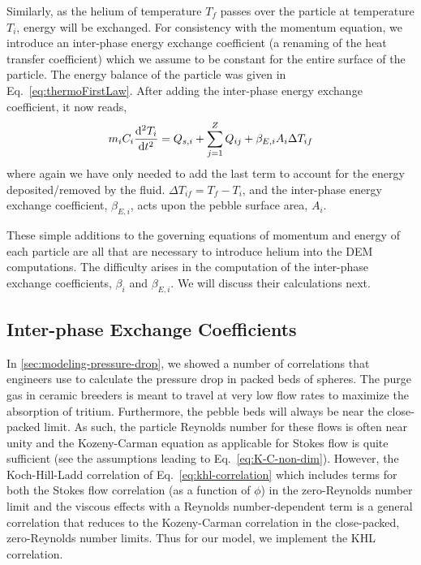 Similarly, as the helium of temperature $T_f$ passes over the particle at temperature $T_i$, energy will be exchanged. For consistency with the momentum equation, we introduce an inter-phase energy exchange coefficient (a renaming of the heat transfer coefficient) which we assume to be constant for the entire surface of the particle. The energy balance of the particle was given in Eq.~\ref{eq:thermoFirstLaw}. After adding the inter-phase energy exchange coefficient, it now reads,
\begin{equation}\label{eq:cfdem-dem-energy}
	m_iC_i \frac{\mathrm{d}^2{T_i}}{\mathrm{d}t^2} = Q_{s,i} + \sum_{j=1}^Z Q_{ij} + \beta_{E,i} A_i \Delta T_{if}
\end{equation}
where again we have only needed to add the last term to account for the energy deposited/removed by the fluid. $\Delta T_{if} = T_f - T_i$, and the inter-phase energy exchange coefficient, $\beta_{E,i}$, acts upon the pebble surface area, $A_i$.

These simple additions to the governing equations of momentum and energy of each particle are all that are necessary to introduce helium into the DEM computations. The difficulty arises in the computation of the inter-phase exchange coefficients, $\beta_i$ and $\beta_{E,i}$. We will discuss their calculations next.

\subsection{Inter-phase Exchange Coefficients}
In \cref{sec:modeling-pressure-drop}, we showed a number of correlations that engineers use to calculate the pressure drop in packed beds of spheres. The purge gas in ceramic breeders is meant to travel at very low flow rates to maximize the absorption of tritium. Furthermore, the pebble beds will always be near the close-packed limit. As such, the particle Reynolds number for these flows is often near unity and the Kozeny-Carman equation as applicable for Stokes flow is quite sufficient (see the assumptions leading to Eq.~\ref{eq:K-C-non-dim}). However, the Koch-Hill-Ladd correlation of Eq.~\ref{eq:khl-correlation} which includes terms for both the Stokes flow correlation (as a function of $\phi$) in the zero-Reynolds number limit and the viscous effects with a Reynolds number-dependent term is a general correlation that reduces to the Kozeny-Carman correlation in the close-packed, zero-Reynolds number limits. Thus for our model, we implement the KHL correlation.

